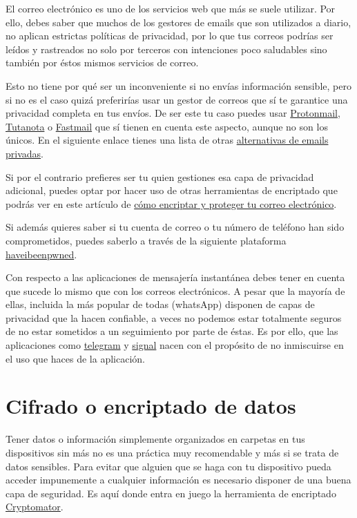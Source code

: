 \documentclass[
  spanish,
  a4paper,
  openany]{book}
\begin{document}
El correo electrónico es uno de los servicios web que más se suele utilizar. Por ello, debes saber que muchos de los gestores de emails que son utilizados a diario, no aplican estrictas políticas de privacidad, por lo que tus correos podrías ser leídos y rastreados no solo por terceros con intenciones poco saludables sino también por éstos mismos servicios de correo.

Esto no tiene por qué ser un inconveniente si no envías información sensible, pero si no es el caso quizá preferirías usar un gestor de correos que sí te garantice una privacidad completa en tus envíos. De ser este tu caso puedes usar \href{https://protonmail.com/}{Protonmail}, \href{https://tutanota.com/es/}{Tutanota} o \href{https://www.fastmail.com}{Fastmail} que sí tienen en cuenta este aspecto, aunque no son los únicos. En el siguiente enlace tienes una lista de otras \href{https://blogthinkbig.com/alternativas-gratuitas-gmail-outlook-privacidad}{alternativas de emails privadas}.

Si por el contrario prefieres ser tu quien gestiones esa capa de privacidad adicional, puedes optar por hacer uso de otras herramientas de encriptado que podrás ver en este artículo de \href{https://www.osi.es/es/actualidad/blog/2019/07/31/como-encriptar-y-proteger-tu-correo-electronico}{cómo encriptar y proteger tu correo electrónico}.

Si además quieres saber si tu cuenta de correo o tu número de teléfono han sido comprometidos, puedes saberlo a través de la siguiente plataforma \href{https://haveibeenpwned.com/}{haveibeenpwned}.

Con respecto a las aplicaciones de mensajería instantánea debes tener en cuenta que sucede lo mismo que con los correos electrónicos. A pesar que la mayoría de ellas, incluida la más popular de todas (whatsApp) disponen de capas de privacidad que la hacen confiable, a veces no podemos estar totalmente seguros de no estar sometidos a un seguimiento por parte de éstas. Es por ello, que las aplicaciones como \href{https://telegram.org/}{telegram} y \href{https://signal.org/es/}{signal} nacen con el propósito de no inmiscuirse en el uso que haces de la aplicación.

\hypertarget{cifrado-o-encriptado-de-datos}{%
\section{Cifrado o encriptado de datos}\label{cifrado-o-encriptado-de-datos}}

Tener datos o información simplemente organizados en carpetas en tus dispositivos sin más no es una práctica muy recomendable y más si se trata de datos sensibles. Para evitar que alguien que se haga con tu dispositivo pueda acceder impunemente a cualquier información es necesario disponer de una buena capa de seguridad. Es aquí donde entra en juego la herramienta de encriptado \href{https://cryptomator.org/}{Cryptomator}.
\end{document}
